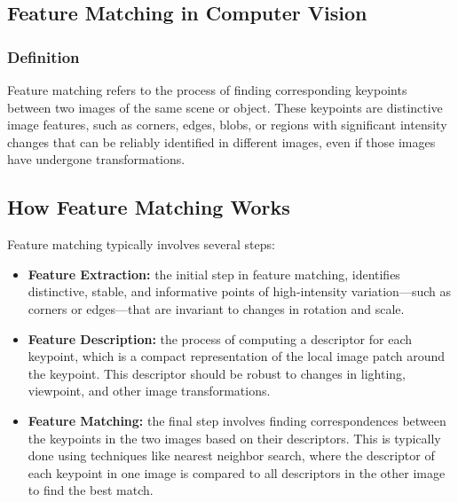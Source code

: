 \subsection{Feature Matching in Computer Vision}
\subsubsection{Definition}
Feature matching refers to the process of finding corresponding keypoints between two images of the same scene or object. These keypoints are distinctive image features, such as corners, edges, blobs, or regions with significant intensity changes that can be reliably identified in different images, even if those images have undergone transformations.
\subsection{How Feature Matching Works}
Feature matching typically involves several steps:
\begin{itemize}
    \item \textbf{Feature Extraction:} the initial step in feature matching, identifies distinctive, stable, and informative points of high-intensity variation—such as corners or edges—that are invariant to changes in rotation and scale.
    \item \textbf{Feature Description:} the process of computing a descriptor for each keypoint, which is a compact representation of the local image patch around the keypoint. This descriptor should be robust to changes in lighting, viewpoint, and other image transformations.
    \item \textbf{Feature Matching:} the final step involves finding correspondences between the keypoints in the two images based on their descriptors. This is typically done using techniques like nearest neighbor search, where the descriptor of each keypoint in one image is compared to all descriptors in the other image to find the best match.
\end{itemize}
